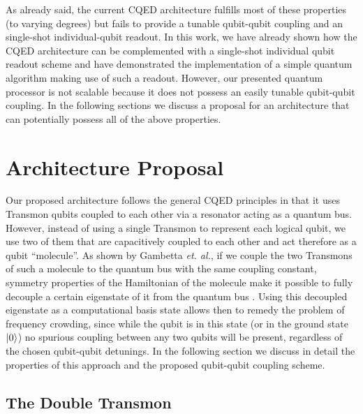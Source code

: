 As already said, the current CQED architecture fulfills most of these properties (to varying degrees) but fails to provide a tunable qubit-qubit coupling and an single-shot individual-qubit readout. In this work, we have already shown how the CQED architecture can be complemented with a single-shot individual qubit readout scheme and have demonstrated the implementation of a simple quantum algorithm making use of such a readout. However, our presented quantum processor is not scalable because it does not possess an easily tunable qubit-qubit coupling. In the following sections we discuss a proposal for an architecture that can potentially possess all of the above properties.

\section{Architecture Proposal}

Our proposed architecture follows the general CQED principles in that it uses Transmon qubits coupled to each other via a resonator acting as a quantum bus. However, instead of using a single Transmon to represent each logical qubit, we use two of them that are capacitively coupled to each other and act therefore as a qubit ``molecule''. As shown by Gambetta {\it et. al.}, if we couple the two Transmons of such a molecule to the quantum bus with the same coupling constant, symmetry properties of the Hamiltonian of the molecule make it possible to fully decouple a certain eigenstate of it from the quantum bus \citep{gambetta_superconducting_2011}. Using this decoupled eigenstate as a computational basis state allows then to remedy the problem of frequency crowding, since while the qubit is in this state (or in the ground state $\left| 0 \right>$) no spurious coupling between any two qubits will be present, regardless of the chosen qubit-qubit detunings. In the following section we discuss in detail the properties of this approach and the proposed qubit-qubit coupling scheme.

\subsection{The Double Transmon} \label{section:double_transmon}

